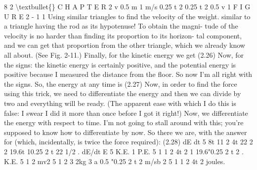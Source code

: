 \documentclass[10pt,oneside]{article}
\begin{document}
8 2 \textbackslash{}textbullet\{\} C H A P T E R  2 v 0.5 m 1 m/s 0.25  t 2 0.25  t 2 0.5 v 1 F I G U R E  2 - 1 1 Using similar triangles to find the velocity of the weight. similar to a triangle having the rod as its hypotenuse! To obtain the magni- tude of the velocity is no harder than finding its proportion to its horizon- tal component, and we can get that proportion from the other triangle, which we already know all about. (See Fig. 2-11.) Finally, for the kinetic energy we get (2.26) Now, for the signs: the kinetic energy is certainly positive, and the potential energy is positive because I measured the distance from the floor. So now I’m all right with the signs. So, the energy at any time is (2.27) Now, in order to find the force using this trick, we need to differentiate the energy and then we can divide by two and everything will be ready. (The apparent ease with which I do this is false: I swear I did it more than once before I got it right!) Now, we differentiate the energy with respect to time. I’m not going to stall around with this; you’re supposed to know how to differentiate by now. So there we are, with the answer for (which, incidentally, is twice the force required): (2.28) dE dt 5 8t 11 2 4t 22 2 2 19.6t 10.25 2 t 22 1/2 . dE/dt E 5 K.E. 1 P.E. 5 1 1 2 4t 2 1 19.6"0.25 2 t 2 . K.E. 5 1 2 mv2 5 1 2 3 2kg 3 a 0.5 "0.25 2 t 2 m/sb 2 5 1 1 2 4t 2 joules.\par
\end{document}
